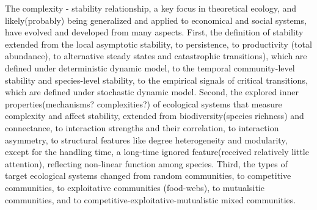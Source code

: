 \documentclass[a4paper,fleqn,12pt]{article}
\begin{document}
The complexity - stability relationship, a key focus in theoretical ecology, and likely(probably) being generalized and applied to economical and social systems, have evolved and developed from many aspects\cite{ives_stability_2007,allesina_stabilitycomplexity_2015,mccann_diversity-stability_2000}.
First, the definition of stability extended from the local asymptotic stability\cite{allesina_stability_2012,tang_correlation_2014}, to persistence\cite{bastolla_architecture_2009,james_disentangling_2012,thebault_stability_2010}, to productivity (total abundance)\cite{suweis_emergence_2013}, to alternative steady states and catastrophic transitions)\cite{beisner_alternative_2003,kefi_when_2016,scheffer_catastrophic_2001,scheffer_catastrophic_2003}, which are defined under deterministic dynamic model,
to the temporal community-level stability and species-level stability\cite{ives_stability_1999,lehman_biodiversity_2000,thibaut_understanding_2013,loreau_species_2008,gross_species_2014}, to the empirical signals of critical transitions\cite{scheffer_early-warning_2009,dakos_methods_2012,carpenter_early_2011,dakos_critical_2014}, which are defined under stochastic dynamic model.
Second, the explored inner properties(mechanisms? complexities?) of ecological systems that measure complexity and affect stability,
extended from biodiversity(species richness) and connectance\cite{naeem_biodiversity_1997,cardinale_biodiversity_2013}, to interaction strengths and their correlation\cite{okuyama_network_2008,rohr_structural_2014,tang_correlation_2014}, to interaction asymmetry\cite{bascompte_asymmetric_2006,vazquez_species_2007,rooney_structural_2006}, to structural features like degree heterogeneity and modularity\cite{bastolla_architecture_2009,saavedra_estimating_2013,lever_sudden_2014,rohr_structural_2014,okuyama_network_2008,suweis_emergence_2013,thebault_stability_2010,grilli_modularity_2016},
except for the handling time, a long-time ignored feature(received relatively little attention), reflecting non-linear function among species.
Third, the types of target ecological systems changed from random communities, to competitive communities\cite{ives_stability_1999,lehman_biodiversity_2000,ives_general_2002}, to exploitative communities (food-webs)\cite{otto_allometric_2007,allesina_predicting_2015,thebault_stability_2010}, to mutualsitic communities\cite{bastolla_architecture_2009,saavedra_estimating_2013,lever_sudden_2014,rohr_structural_2014,okuyama_network_2008,suweis_emergence_2013}, and to competitive-exploitative-mutualistic mixed communities\cite{mougi_diversity_2012,suweis_disentangling_2013}.
\end{document}
